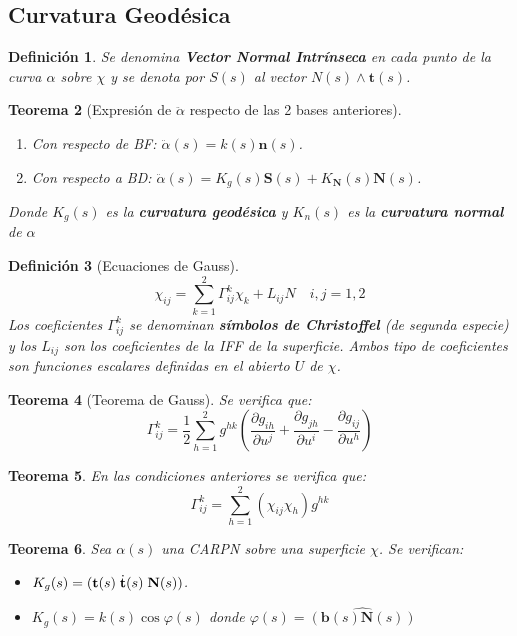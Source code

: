 \documentclass[twoside]{article}
\newtheorem{theorem}{Teorema}[section]
\newtheorem{defi}[theorem]{Definición}
\numberwithin{equation}{section}
\begin{document}
\subsection{Curvatura Geodésica}

\begin{defi}Se denomina \textbf{Vector Normal Intrínseca} en cada punto de la curva $\alpha$ sobre $\chi$ y se denota por $S(s)$ al vector $N(s)\wedge\textbf{t}(s)$.
\end{defi}

\begin{theorem}[Expresión de $\ddot{\alpha}$ respecto de las 2 bases anteriores]\
\begin{enumerate}
\item[A] Con respecto de BF: $\ddot{\alpha}(s)=k(s)\textbf{n}(s)$.
\item[B] Con respecto a BD: $\ddot{\alpha}(s)=K_g(s)\textbf{S}(s)+K_\textbf{N}(s)\textbf{N}(s)$. 
\end{enumerate}
Donde $K_g(s)$ es la \textbf{curvatura geodésica} y $K_n(s)$ es la \textbf{curvatura normal} de $\alpha$
\end{theorem}

\begin{defi}[Ecuaciones de Gauss] 
\begin{equation*}
\chi_{ij}=\sum_{k=1}^2\Gamma_{ij}^k\chi_k+L_{ij}N\quad i,j=1,2
\end{equation*}
Los coeficientes $\Gamma_{ij}^k$ se denominan \textbf{símbolos de Christoffel} (de segunda especie) y los $L_{ij}$ son los coeficientes de la IFF de la superficie. Ambos tipo de coeficientes son funciones escalares definidas en el abierto $U$ de $\chi$.
\end{defi}

\begin{theorem}[Teorema de Gauss]
Se verifica que:
\[
\Gamma_{ij}^k = \frac{1}{2}\sum_{h=1}^2 g^{hk}\left(\frac{\partial g_{ih}}{\partial u^j}+\frac{\partial g_{jh}}{\partial u^i}-\frac{\partial g_{ij}}{\partial u^h}\right)
\]
\end{theorem}
\begin{theorem}
En las condiciones anteriores se verifica que:
\[\Gamma^k_{ij} = \sum_{h=1}^2 (\chi_{ij} \chi_h ) g^{hk}\]
\end{theorem}


\begin{theorem}
Sea $\alpha(s)$ una CARPN sobre una superficie $\chi$. Se verifican:
\begin{itemize}
\item $K_g(s) = ({\bf t}(s)\; \dot{\bf t}(s) \; \textbf{N}(s) )$.
\item $K_g(s) = k(s)\cos{\varphi(s)}$ donde $\varphi(s)=\widehat{(\textbf{b}(s) \textbf{N}(s))}$
\end{itemize}
\end{theorem}
\end{document}
